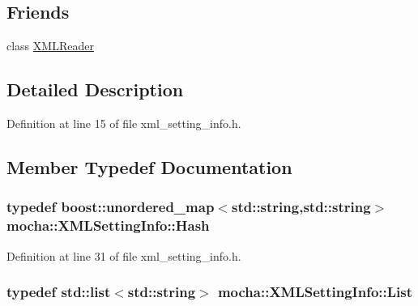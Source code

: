 \subsection*{Friends}
\begin{DoxyCompactItemize}
\item 
class \hyperlink{classmocha_1_1_x_m_l_setting_info_a9894c054a14fd954866c8a55e6dfb276}{XMLReader}
\end{DoxyCompactItemize}


\subsection{Detailed Description}


Definition at line 15 of file xml\_\-setting\_\-info.h.



\subsection{Member Typedef Documentation}
\hypertarget{classmocha_1_1_x_m_l_setting_info_a2954735e05daa0b58bebbe20124aeb94}{
\subsubsection[{Hash}]{\setlength{\rightskip}{0pt plus 5cm}typedef boost::unordered\_\-map$<$std::string,std::string$>$ {\bf mocha::XMLSettingInfo::Hash}}}
\label{classmocha_1_1_x_m_l_setting_info_a2954735e05daa0b58bebbe20124aeb94}


Definition at line 31 of file xml\_\-setting\_\-info.h.

\hypertarget{classmocha_1_1_x_m_l_setting_info_aaf66398a517745d0580193a8f89624f2}{
\subsubsection[{List}]{\setlength{\rightskip}{0pt plus 5cm}typedef std::list$<$std::string$>$ {\bf mocha::XMLSettingInfo::List}}}
\label{classmocha_1_1_x_m_l_setting_info_aaf66398a517745d0580193a8f89624f2}


